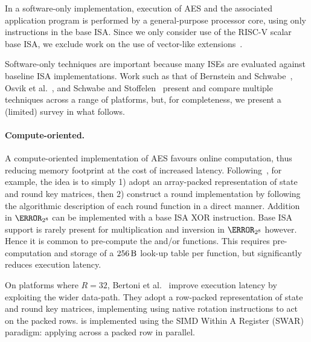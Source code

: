 
In a software-only implementation,
execution of AES
and
the associated application program
is 
performed by 
a general-purpose processor core, using only instructions in the base ISA.
Since we only consider use of the RISC-V scalar base ISA, we exclude work on
the use of vector-like extensions~\cite{Hamburg:09}.

Software-only techniques are important because 
many ISEs are evaluated against baseline ISA implementations.
Work such as that of
Bernstein and Schwabe~\cite{BerSch:08},
Osvik et al.~\cite{OBSC:10},
and
Schwabe and Stoffelen~\cite{SchSto:16}
present and compare multiple techniques across a range of platforms, but,
for completeness, we present a (limited) survey in what follows.


\paragraph{Compute-oriented.}

A compute-oriented implementation of AES favours
 online     computation, 
thus reducing 
memory footprint
at the cost of increased 
latency.
Following~\cite[Section 4.1]{DaeRij:02}, for example, the idea is to simply
1) adopt an
    array-packed
   representation of state and round key matrices,
   then
2) construct a round implementation by following the algorithmic description
   of each round function in a direct manner.
Addition in $\F_{2^8}$ can be implemented with a base ISA XOR instruction.
Base ISA support is rarely present for multiplication and inversion in
$\F_{2^8}$ however.
Hence it is common to pre-compute the  and/or  
functions.
This requires pre-computation and storage of a
$
\SI{256}{\byte}
$
look-up table per function, but significantly reduces execution latency.

On platforms where $R = 32$,
Bertoni et al.~\cite{BBFMM:02}
improve execution latency by exploiting the wider data-path.
They adopt a row-packed representation of state and round key matrices,
implementing
using native rotation instructions to act on the packed rows.
 is implemented
using the SIMD Within A Register (SWAR) paradigm:
applying
across a packed row in parallel.


